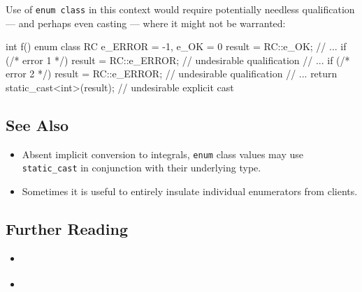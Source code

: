 \noindent Use of \texttt{enum}~\texttt{class} in this context would require
potentially needless qualification --- and perhaps even casting ---
where it might not be warranted:

\begin{emcppslisting}
int f()
{
    enum class RC { e_ERROR = -1, e_OK = 0 } result = RC::e_OK;
    // ...
    if (/* error 1 */) { result = RC::e_ERROR; } // undesirable qualification
    // ...
    if (/* error 2 */) { result = RC::e_ERROR; } // undesirable qualification
    // ...
    return static_cast<int>(result);  // undesirable explicit cast
}
\end{emcppslisting}

\subsection[See Also]{See Also}\label{see-also}

\begin{itemize}
\item{Absent implicit conversion to integrals, \texttt{enum} class values may use \texttt{static\_cast} in conjunction with their underlying type.}
\item{Sometimes it is useful to entirely insulate individual enumerators from clients.}
\end{itemize}

\subsection[Further Reading]{Further Reading}\label{further-reading}

\begin{itemize}
\item{\cite{miller19}}
\item{\cite{meyers15}}
\end{itemize}


